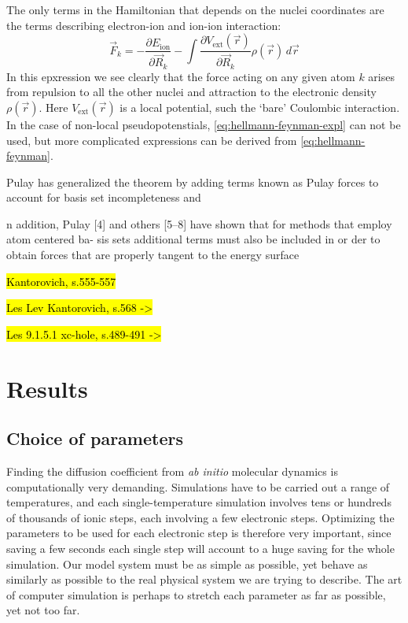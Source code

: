 \documentclass[11pt,bibliography=totoc,index=totoc]{scrbook}   %
\newcommand{\comment}[1]{\hl{#1}}
\begin{document}
The only terms in the Hamiltonian that depends on the nuclei coordinates are the terms describing
electron-ion and ion-ion interaction:
\begin{equation}
  \vec{F}_k = - \frac{\partial E_{\text{ion}}}{\partial\vec{R}_k} - \int \frac{\partial V_{\text{ext}}(\vec{r})}{\partial\vec{R}_k} \rho(\vec{r}) \,d\vec{r}
  \label{eq:hellmann-feynman-expl}
\end{equation}
In this epxression we see clearly that the force acting on any given atom $k$ arises from repulsion to all the other nuclei and attraction to the electronic density $\rho(\vec{r})$. Here $V_{\text{ext}}(\vec{r})$ is a local potential, such the `bare' Coulombic interaction. 
In the case of non-local pseudopotenstials, \eqref{eq:hellmann-feynman-expl} can not be used, but more complicated expressions can be derived from \eqref{eq:hellmann-feynman}.



Pulay\cite{Pulay:1969} has generalized the theorem by adding terms known as Pulay forces to account
for basis set incompleteness and 

n addition, Pulay [4] and others [5–8] have shown that for methods that employ atom centered ba- sis sets additional terms must also be included in or
der to obtain forces that are properly tangent to the energy surface


\comment{Kantorovich, s.555-557}

\comment{Les Lev Kantorovich, s.568 ->}

\comment{Les 9.1.5.1 xc-hole, s.489-491 ->}




\chapter{Results}

\section{Choice of parameters}

Finding the diffusion coefficient from \textit{ab initio} molecular dynamics is computationally very demanding.
Simulations have to be carried out a range of temperatures, and each single-temperature simulation involves tens or hundreds of thousands of ionic steps, each involving a few electronic steps. 
Optimizing the parameters to be used for each electronic step is therefore very important, since saving a few seconds each single step will account to a huge saving for the whole simulation. 
Our model system must be as simple as possible, yet behave as similarly as possible to the real physical system we are trying to describe. 
The art of computer simulation is perhaps to stretch each parameter as far as possible, yet not too far. 
\end{document}
